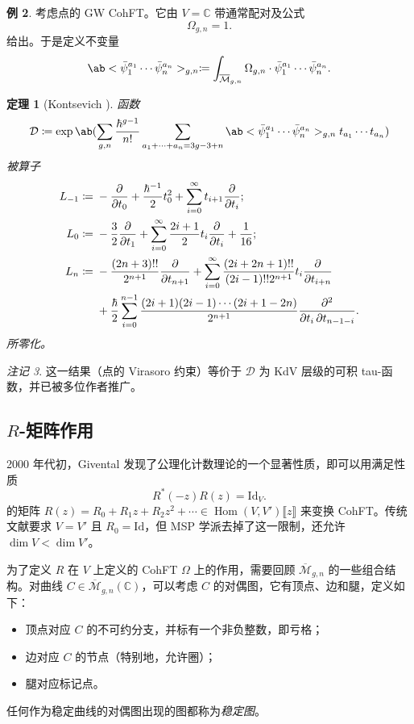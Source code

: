 \documentclass{amsart}
\newtheorem{thm}{定理}[section]
\theoremstyle{definition}
\newtheorem{exm}[thm]{例}
\theoremstyle{remark}
\newtheorem{rmk}[thm]{注记}
\theoremstyle{plain}
\theoremstyle{definition}
\theoremstyle{remark}
\newcommand{\C}{\mathbb{C}}
\newcommand{\Mbar}{\overline{\mathcal{M}}}
\newcommand{\mc}[1]{\mathcal{#1}}
\newcommand{\mr}[1]{\mathrm{#1}}
\newcommand{\1}{\mathbf{1}}
\newcommand{\2}{\mathbf{2}}
\newcommand{\3}{\mathbf{3}}
\newcommand{\ps}[1]{\llbracket #1 \rrbracket}
\DeclareMathOperator{\Hom}{Hom}
\begin{document}
\begin{exm}
    考虑点的 GW CohFT。它由 \(V = \C\) 带通常配对及公式
    \[ \Omega_{g,n} = 1. \]
    给出。于是定义不变量
    \[ \ab<\bar{\psi}_1^{a_1} \cdots \bar{\psi}_n^{a_n}>_{g,n} \coloneqq \int_{\Mbar_{g,n}} \Omega_{g,n} \cdot \bar{\psi}_1^{a_1} \cdots \bar{\psi}_n^{a_n}. \]
    \begin{thm}[Kontsevich {\cite{Kontsevich1992}}]
        函数
        \[ \mc{D} \coloneqq \exp \ab(\sum_{g,n} \frac{\hbar^{g-1}}{n!}\sum_{a_1 + \cdots + a_n = 3g-3+n} \ab<\bar{\psi}_1^{a_1} \cdots \bar{\psi}_n^{a_n}>_{g,n} t_{a_1}\cdots t_{a_n}) \]
        被算子
        \begin{align*}
            L_{-1} \coloneqq{}& -\pdv{}{t_0} + \frac{\hbar^{-1}}{2} t_0^2 + \sum_{i=0}^{\infty} t_{i+1} \pdv{}{t_i};\\
            L_0 \coloneqq{}& -\frac{3}{2} \pdv{}{t_1} + \sum_{i=0}^{\infty} \frac{2i+1}{2} t_i \pdv{}{t_i} + \frac{1}{16};\\
            L_n \coloneqq{}& -\frac{(2n+3)!!}{2^{n+1}} \pdv{}{t_{n+1}} + \sum_{i=0}^{\infty} \frac{(2i+2n+1)!!}{(2i-1)!! 2^{n+1}} t_i \pdv{}{t_{i+n}} \\
            &+ \frac{\hbar}{2} \sum_{i=0}^{n-1} \frac{(2i+1) (2i-1) \cdots (2i+1-2n)}{2^{n+1}} \pdv{}{t_i,t_{n-1-i}}.
        \end{align*}
        所零化。
    \end{thm}
\end{exm}

\begin{rmk}
    这一结果（点的 Virasoro 约束）等价于 \(\mc{D}\) 为 KdV 层级的可积 tau-函数，并已被多位作者推广。
\end{rmk}



\subsection{$R$-矩阵作用}%
\label{sub:R-matrix action}

2000 年代初，Givental 发现了公理化计数理论的一个显著性质，即可以用满足性质
\[ R^*(-z) R(z) = \mr{Id}_V. \]
的矩阵 \(R(z) = R_0 + R_1 z + R_2 z^2 + \cdots \in \Hom(V, V')\ps{z}\) 来变换 CohFT。传统文献要求 \(V = V'\) 且 \(R_0 = \mr{Id}\)，但 MSP 学派去掉了这一限制，还允许 \(\dim V < \dim V'\)。

为了定义 \(R\) 在 \(V\) 上定义的 CohFT \(\Omega\) 上的作用，需要回顾 \(\Mbar_{g,n}\) 的一些组合结构。对曲线 \(C\in \Mbar_{g,n}(\C)\)，可以考虑 \(C\) 的对偶图，它有顶点、边和腿，定义如下：
\begin{itemize}
    \item 顶点对应 \(C\) 的不可约分支，并标有一个非负整数，即亏格；
    \item 边对应 \(C\) 的节点（特别地，允许圈）；
    \item 腿对应标记点。
\end{itemize}
任何作为稳定曲线的对偶图出现的图都称为\textit{稳定图}。
\end{document}
